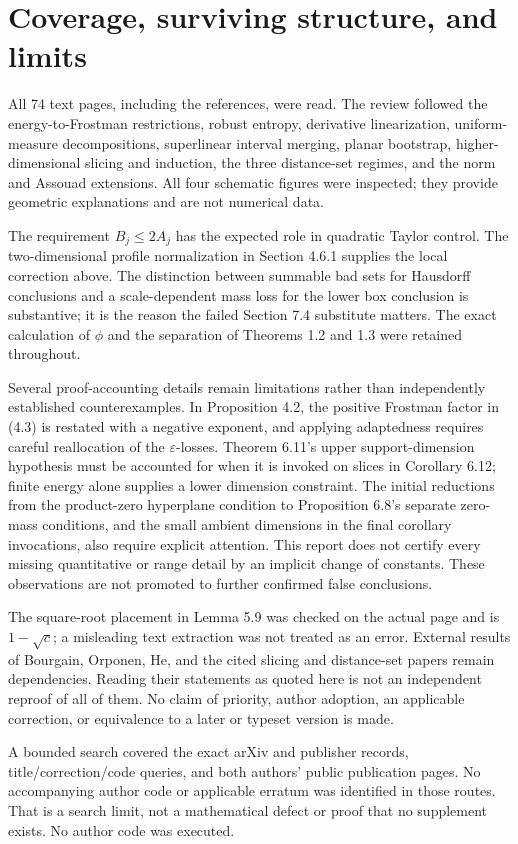 \documentclass[10pt]{article}
\begin{document}
\section*{Coverage, surviving structure, and limits}
All 74 text pages, including the references, were read. The review followed the energy-to-Frostman restrictions, robust entropy, derivative linearization, uniform-measure decompositions, superlinear interval merging, planar bootstrap, higher-dimensional slicing and induction, the three distance-set regimes, and the norm and Assouad extensions. All four schematic figures were inspected; they provide geometric explanations and are not numerical data.\par
The requirement \(B_j\le2A_j\) has the expected role in quadratic Taylor control. The two-dimensional profile normalization in Section 4.6.1 supplies the local correction above. The distinction between summable bad sets for Hausdorff conclusions and a scale-dependent mass loss for the lower box conclusion is substantive; it is the reason the failed Section 7.4 substitute matters. The exact calculation of \(\phi\) and the separation of Theorems 1.2 and 1.3 were retained throughout.\par
Several proof-accounting details remain limitations rather than independently established counterexamples. In Proposition 4.2, the positive Frostman factor in (4.3) is restated with a negative exponent, and applying adaptedness requires careful reallocation of the \(\varepsilon\)-losses. Theorem 6.11’s upper support-dimension hypothesis must be accounted for when it is invoked on slices in Corollary 6.12; finite energy alone supplies a lower dimension constraint. The initial reductions from the product-zero hyperplane condition to Proposition 6.8’s separate zero-mass conditions, and the small ambient dimensions in the final corollary invocations, also require explicit attention. This report does not certify every missing quantitative or range detail by an implicit change of constants. These observations are not promoted to further confirmed false conclusions.\par
The square-root placement in Lemma 5.9 was checked on the actual page and is \(1-\sqrt c\); a misleading text extraction was not treated as an error. External results of Bourgain, Orponen, He, and the cited slicing and distance-set papers remain dependencies. Reading their statements as quoted here is not an independent reproof of all of them. No claim of priority, author adoption, an applicable correction, or equivalence to a later or typeset version is made.\par
A bounded search covered the exact arXiv and publisher records, title/correction/code queries, and both authors’ public publication pages. No accompanying author code or applicable erratum was identified in those routes. That is a search limit, not a mathematical defect or proof that no supplement exists. No author code was executed.\par
\end{document}
